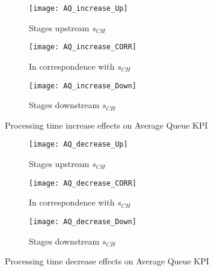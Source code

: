 \begin{landscape}
\begin{figure}[p]
  \centering
  \begin{subfigure}[t]{0.4\textwidth}
    \texttt{[image: AQ\_increase\_Up]}
    \caption{Stages upstream $s_{CH}$}
    \label{fig:Processing time increase effects on Average Queue KPI - Stages upstream}   
  \end{subfigure}
  \begin{subfigure}[t]{0.4\textwidth}
    \texttt{[image: AQ\_increase\_CORR]}
    \caption{In correspondence with $s_{CH}$}
    \label{fig:Processing time increase effects on Average Queue KPI - In correspondence with}   
  \end{subfigure}
  \begin{subfigure}[t]{0.4\textwidth}
    \texttt{[image: AQ\_increase\_Down]}
    \caption{Stages downstream $s_{CH}$}
    \label{fig:Processing time increase effects on Average Queue KPI - Stages downstream}   
  \end{subfigure}
  \caption{Processing time increase effects on Average Queue KPI}
  \label{fig:Processing time increase effects on Average Queue KPI}
\end{figure}
\begin{figure}[p]
  \centering
  \begin{subfigure}[b]{0.4\textwidth}
    \texttt{[image: AQ\_decrease\_Up]}
    \caption{Stages upstream $s_{CH}$}
    \label{fig:Processing time decrease effects on Average Queue KPI - Stages upstream}   
  \end{subfigure}
  \begin{subfigure}[b]{0.4\textwidth}
    \texttt{[image: AQ\_decrease\_CORR]}
    \caption{In correspondence with $s_{CH}$}
    \label{fig:Processing time decrease effects on Average Queue KPI - In correspondence with}   
  \end{subfigure}
  \begin{subfigure}[b]{0.4\textwidth}
    \texttt{[image: AQ\_decrease\_Down]}
    \caption{Stages downstream $s_{CH}$}
    \label{fig:Processing time decrease effects on Average Queue KPI - Stages downstream}   
  \end{subfigure}
  \caption{Processing time decrease effects on Average Queue KPI}
  \label{fig:Processing time decrease effects on Average Queue KPI}
\end{figure}
\end{landscape}
